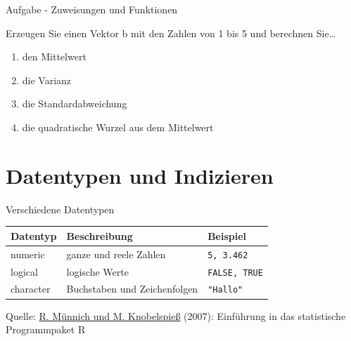 \documentclass[
  ignorenonframetext,
]{beamer}
\begin{document}
\begin{frame}{Aufgabe - Zuweisungen und Funktionen}
\protect\hypertarget{aufgabe---zuweisungen-und-funktionen}{}

Erzeugen Sie einen Vektor b mit den Zahlen von 1 bis 5 und berechnen
Sie\ldots{}

\begin{enumerate}
\item
  den Mittelwert
\item
  die Varianz
\item
  die Standardabweichung
\item
  die quadratische Wurzel aus dem Mittelwert
\end{enumerate}

\end{frame}

\hypertarget{datentypen-und-indizieren}{%
\section{Datentypen und Indizieren}\label{datentypen-und-indizieren}}

\begin{frame}[fragile]{Verschiedene Datentypen}
\protect\hypertarget{verschiedene-datentypen}{}

\begin{longtable}[]{@{}lll@{}}
\toprule
Datentyp & Beschreibung & Beispiel\tabularnewline
\midrule
\endhead
numeric & ganze und reele Zahlen & \texttt{5,\ 3.462}\tabularnewline
logical & logische Werte & \texttt{FALSE,\ TRUE}\tabularnewline
character & Buchstaben und Zeichenfolgen &
\texttt{"Hallo"}\tabularnewline
\bottomrule
\end{longtable}

Quelle:
\href{https://www.uni-trier.de/fileadmin/fb4/prof/VWL/FIN/Oekonometrie/PC-UEbung/Einfuehrung_in_R.pdf}{R.
Münnich und M. Knobelspieß} (2007): Einführung in das statistische
Programmpaket R

\end{frame}
\end{document}
